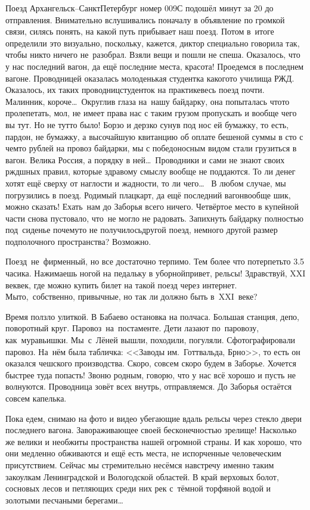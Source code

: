 Поезд Архангельск\nobreakdash--Санкт\sdash Петербург номер 009С подошёл минут за 20 до отправления. Внимательно вслушивались поначалу в объявление по громкой связи, силясь понять, на какой путь прибывает наш поезд. Потом в~итоге определили это визуально, поскольку, кажется, диктор специально говорила так, чтобы никто ничего не~разобрал. Взяли вещи и пошли не спеша. Оказалось, что у нас последний вагон, да ещё последние места, красота! Проедемся в последнем вагоне. Проводницей оказалась молоденькая студентка какого\sdash то училища РЖД. Оказалось, их таких проводниц\sdash студенток на практике\mdash весь поезд почти. Малинник, короче\ldots~Округлив глаза на~нашу байдарку, она попыталась что\sdash то пролепетать, мол, не имеет права нас с таким грузом пропускать и вообще чего вы тут. Но не тут\sdash то было! Борзо и дерзко сунув под нос ей бумажку, то есть, пардон, не бумажку, а высочайшую квитанцию об оплате бешеной суммы в сто с чем\sdash то рублей на провоз байдарки, мы с победоносным видом стали грузиться в вагон. Велика Россия, а порядку в ней\ldots~Проводники и сами не знают своих ржд\sdash шных правил, которые здравому смыслу вообще не поддаются. То ли денег хотят ещё сверху от наглости и жадности, то ли чего\ldots~
\newpage
В любом случае, мы погрузились в поезд. Родимый плацкарт, да ещё последний вагон\mdash вообще шик, можно сказать! Ехать~нам до Заборья всего ничего. Четвёртое место в купейной части снова пустовало, что~не могло не радовать. Запихнуть байдарку полностью под~сиденье почему\sdash то не получилось\mdash другой поезд, немного другой размер подполочного пространства? Возможно. 

Поезд~не~фирменный, но все достаточно терпимо. Тем более что потерпеть\sdash то 3.5 часика. Нажимаешь ногой на педальку в уборной\mdash привет, рельсы! Здравствуй, XXI век\mdash век, где можно купить билет на такой поезд через интернет. Мы\sdash то,~собственно, привычные, но так ли должно быть в~XXI~веке?

Время ползло улиткой. В Бабаево остановка на полчаса. Большая станция, депо, поворотный круг. Паровоз~на~постаменте. Дети лазают по~паровозу, как~муравьишки. Мы~с~Лёней вышли, походили, погуляли. Сфотографировали паровоз. На~нём была табличка: <<Заводы им.~Готтвальда, Брно>>, то есть он оказался чешского производства. Скоро, совсем скоро будем в Заборье. Хочется быстрее туда попасть! Звоню родным, говорю, что у нас всё хорошо и пусть не волнуются. Проводница зовёт всех внутрь, отправляемся. До Заборья остаётся совсем капелька.

Пока едем, снимаю на фото и видео убегающие вдаль рельсы через стекло двери последнего вагона. Завораживающее своей бесконечностью зрелище! Насколько же велики и необжиты пространства нашей огромной страны. И как хорошо, что они медленно обживаются и ещё есть места, не испорченные человеческим присутствием. Сейчас мы стремительно несёмся навстречу именно таким закоулкам Ленинградской и Вологодской областей. В край верховых болот, сосновых лесов и петляющих среди них рек с~тёмной торфяной водой и золотыми песчаными берегами\ldots~

